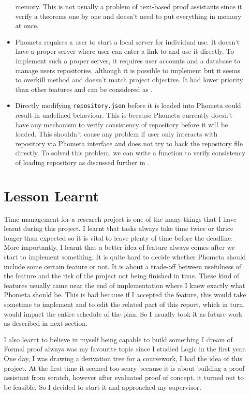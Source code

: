 \documentclass[master.tex]{subfiles}
\begin{document}
\begin{itemize}
  memory. This is not usually a problem of text-based proof assistants since it
  verify a theorems one by one and doesn't need to put everything in memory at
  once.
\item Phometa requires a user to start a local server for individual use. It
  doesn't have a proper server where user can enter a link to and use it
  directly. To implement such a proper server, it requires user accounts and a
  database to manage users repositories, although it is possible to implement
  but it seems to overkill method and doesn't match project objective. It had
  lower priority than other features and can be considered as \hrefFutureWork.
\item Directly modifying \texttt{repository.json} before it is loaded into
  Phometa could result in undefined behaviour. This is because Phometa currently
  doesn't have any mechanism to verify consistency of repository before it will
  be loaded. This shouldn't cause any problem if user only interacts with
  repository via Phometa interface and does not try to hack the repository file
  directly. To solved this problem, we can write a function to verify
  consistency of loading repository as discussed further in \hrefFutureWork.
\end{itemize}

\section{Lesson Learnt}

Time management for a research project is one of the many things that I have
learnt during this project. I learnt that tasks always take time twice or thrice
longer than expected so it is vital to leave plenty of time before the deadline.
More importantly, I learnt that a better idea of feature always comes after we
start to implement something. It is quite hard to decide whether Phometa should
include some certain feature or not. It is about a trade-off between usefulness
of the feature and the risk of the project not being finished in time. These
kind of features usually came near the end of implementation where I knew
exactly what Phometa should be. This is bad because if I accepted the feature,
this would take sometime to implement and to edit the related part of this
report, which in turn, would impact the entire schedule of the plan. So I
usually took it as future work as described in next section.

I also learnt to believe in myself being capable to build something I dream of.
Formal proof always was my favourite topic since I studied Logic in the first
year. One day, I was drawing a derivation tree for a coursework, I had the idea
of this project. At the first time it seemed too scary because it is about
building a proof assistant from scratch, however after evaluated proof of
concept, it turned out to be feasible. So I decided to start it and approached
my supervisor.
\end{document}
